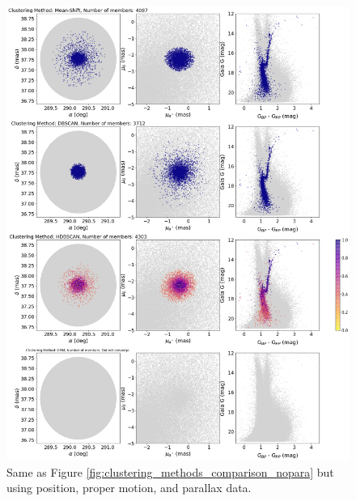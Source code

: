 \begin{figure}[hbtp]
    \centering
    \includegraphics[width=0.92\linewidth]{Chapter4/6791_cluster_comp_pospmpara.png}
    \caption[Clustering method comparison - NGC\,6791 (II)]{Same as Figure \ref{fig:clustering_methods_comparison_nopara} but using position, proper motion, and parallax data.}
    \label{fig:clustering_methods_comparison_para}
\end{figure}

